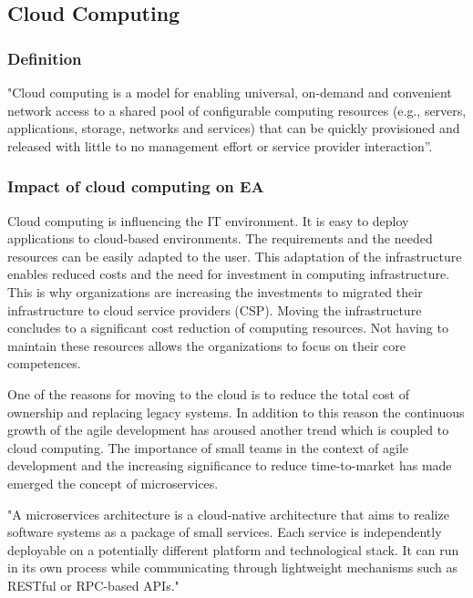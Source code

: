 \subsection{Cloud Computing}

\subsubsection{Definition}
"Cloud computing is a model for enabling universal, on-demand and convenient network access to a shared pool of configurable computing resources (e.g., servers, applications, storage, networks and services) that can be quickly provisioned and released with little to no management effort or service provider interaction”. \cite{IsaacOdun-AyoFrankAgono2018}\cite{Badger2012}


\subsubsection{Impact of cloud computing on EA}
Cloud computing is influencing the IT environment. It is easy to deploy applications to cloud-based environments. The requirements and the needed resources can be easily adapted to the user. This adaptation of the infrastructure enables reduced costs and the need for investment in computing infrastructure. This is why organizations are increasing the investments to migrated their infrastructure to cloud service providers (CSP). Moving the infrastructure concludes to a significant cost reduction of computing resources. Not having to maintain these resources allows the organizations to focus on their core competences. \cite{IsaacOdun-AyoFrankAgono2018}

One of the reasons for moving to the cloud is to reduce the total cost of ownership and replacing legacy systems. \cite{IsaacOdun-AyoFrankAgono2018} In addition to this reason the continuous growth of the agile development has aroused another trend which is coupled to cloud computing. The importance of small teams in the context of agile development and the increasing significance to reduce time-to-market has made emerged the concept of microservices. 

"A microservices architecture is a cloud-native architecture that aims to realize software systems as a package of small services. Each service is independently deployable on a potentially different platform and technological stack. It can run in its own process while communicating through lightweight mechanisms such as RESTful or RPC-based APIs." \cite{Balalaie2016} 

